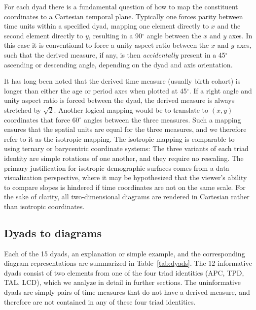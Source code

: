 \documentclass[12pt,oneside,a4paper]{article} %
\theoremstyle{definition}
\begin{document}
For each dyad there is a fundamental question of how to map the constituent
coordinates to a Cartesian temporal plane. Typically one forces parity between time units within
a specified dyad, mapping one element directly to $x$ and the second element
directly to $y$, resulting in a 90$^\circ$ angle between the $x$ and $y$
axes. In this case it is conventional to force a unity aspect ratio
between the $x$ and $y$ axes, such that the derived measure, if any, is then
\textit{accidentally} present in a 45$^\circ$ ascending or descending angle,
depending on the dyad and axis orientation. 

It has long been noted \citep{lexis1875einleitung, perozzo1880della} that the
derived time measure (usually birth cohort) is longer than either the age or period axes when plotted at 45$^\circ$.
If a right angle and unity aspect ratio is forced between the dyad, the derived measure is always stretched by
$\sqrt{2}$. Another
logical mapping would be to translate to $(x,y)$ coordinates that force 60$^\circ$
angles between the three measures. Such a mapping ensures that the spatial units are equal for the three measures, and we therefore refer to it as the isotropic mapping. The isotropic mapping
is comparable to using ternary or barycentric coordinate systems: The three variants of each
 triad identity are simple rotations of one another, and they require no
 rescaling. The primary justification for isotropic demographic surfaces comes from
a data visualization perspective, where it may be hypothesized that the
 viewer's ability to compare slopes is hindered if time coordinates are not on
 the same scale. For the sake of clarity, all two-dimensional diagrams are rendered in
 Cartesian rather than isotropic coordinates.

\subsection{Dyads to diagrams}
Each of the 15 dyads, an explanation or simple example,
and the corresponding diagram representations are summarized in
Table~\ref{tab:dyads}. The 12 informative dyads consist of two
elements from one of the four triad identities (APC, TPD, TAL, LCD), which we
analyze in detail in further sections. The uninformative dyads are simply pairs
of time measures that do not have a derived measure, and therefore are not
contained in any of these four triad identities.
\pagebreak
\end{document}
